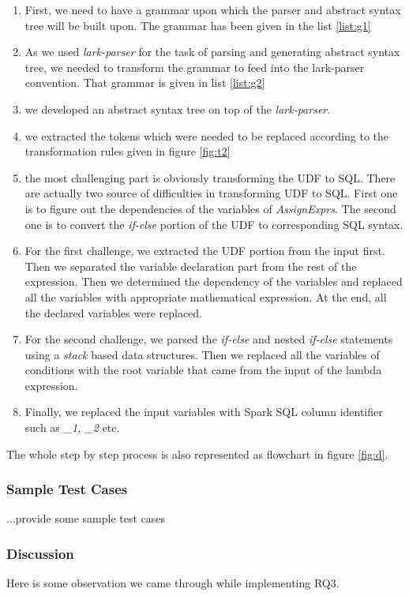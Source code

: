 \documentclass[sigplan]{acmart}\settopmatter{printfolios=true,printccs=false,printacmref=false}
\begin{document}
\begin{enumerate}
    \item First, we need to have a grammar upon which the parser and abstract syntax tree will be built upon. The grammar has been given in the list \ref{list:g1}
    \item As we used \textit{lark-parser} for the task of parsing and generating abstract syntax tree, we needed to transform the grammar to feed into the lark-parser convention. That grammar is given in list \ref{list:g2}
    \item we developed an abstract syntax tree on top of the \textit{lark-parser}. 
    \item we extracted the tokens which were needed to be replaced according to the transformation rules given in figure \ref{fig:t2}
    \item the most challenging part is obviously transforming the UDF to SQL. There are actually two source of difficulties in transforming UDF to SQL. First one is to figure out the dependencies of the variables of \textit{AssignExprs}. The second one is to convert the \textit{if-else} portion of the UDF to corresponding SQL syntax. 
    \item For the first challenge, we extracted the UDF portion from the input first. Then we separated the variable declaration part from the rest of the expression. Then we determined the dependency of the variables and replaced all the variables with appropriate mathematical expression. At the end, all the declared variables were replaced. 
    \item For the second challenge, we parsed the \textit{if-else} and nested \textit{if-else} statements using a \textit{stack} based data structures. Then we replaced all the variables of conditions with the root variable that came from the input of the lambda expression. \item Finally, we replaced the input variables with Spark SQL column identifier such as \textit{\_1, \_2} etc.
\end{enumerate}

The whole step by step process is also represented as flowchart in figure \ref{fig:d}.

\subsubsection{Sample Test Cases}
...provide some sample test cases

\subsubsection{Discussion}
Here is some observation we came through while implementing RQ3.
\end{document}
